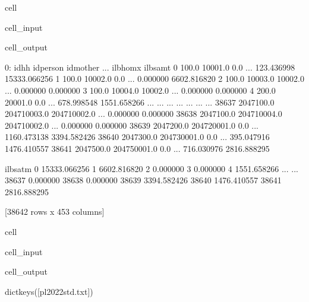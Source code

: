 \documentclass[letterpaper,10pt,english]{sphinxmanual}
\begin{document}
\begin{sphinxuseclass}{cell}
\begin{sphinxuseclass}{cell_input}
\begin{sphinxVerbatim}[commandchars=\\\{\}]
\PYG{p}{[}\PYG{p}{]}
\end{sphinxVerbatim}

\end{sphinxuseclass}
\begin{sphinxuseclass}{cell_output}
\begin{sphinxVerbatim}[commandchars=\\\{\}]
0:             idhh     idperson     idmother  ...     il\PYGZus{}bhomx      il\PYGZus{}bsamt  \PYGZbs{}
0          100.0      10001.0          0.0  ...   123.436998  15333.066256   
1          100.0      10002.0          0.0  ...     0.000000   6602.816820   
2          100.0      10003.0      10002.0  ...     0.000000      0.000000   
3          100.0      10004.0      10002.0  ...     0.000000      0.000000   
4          200.0      20001.0          0.0  ...   678.998548   1551.658266   
...          ...          ...          ...  ...          ...           ...   
38637  2047100.0  204710003.0  204710002.0  ...     0.000000      0.000000   
38638  2047100.0  204710004.0  204710002.0  ...     0.000000      0.000000   
38639  2047200.0  204720001.0          0.0  ...  1160.473138   3394.582426   
38640  2047300.0  204730001.0          0.0  ...   395.047916   1476.410557   
38641  2047500.0  204750001.0          0.0  ...   716.030976   2816.888295   

           il\PYGZus{}bsatm  
0      15333.066256  
1       6602.816820  
2          0.000000  
3          0.000000  
4       1551.658266  
...             ...  
38637      0.000000  
38638      0.000000  
38639   3394.582426  
38640   1476.410557  
38641   2816.888295  

[38642 rows x 453 columns]
\end{sphinxVerbatim}

\end{sphinxuseclass}
\end{sphinxuseclass}
\begin{sphinxuseclass}{cell}
\begin{sphinxuseclass}{cell_input}
\begin{sphinxVerbatim}[commandchars=\\\{\}]
\PYG{p}{[}\PYG{p}{]}
\end{sphinxVerbatim}

\end{sphinxuseclass}
\begin{sphinxuseclass}{cell_output}
\begin{sphinxVerbatim}[commandchars=\\\{\}]
dict\PYGZus{}keys([\PYGZsq{}pl\PYGZus{}2022\PYGZus{}std.txt\PYGZsq{}])
\end{sphinxVerbatim}

\end{sphinxuseclass}
\end{sphinxuseclass}
\end{document}
